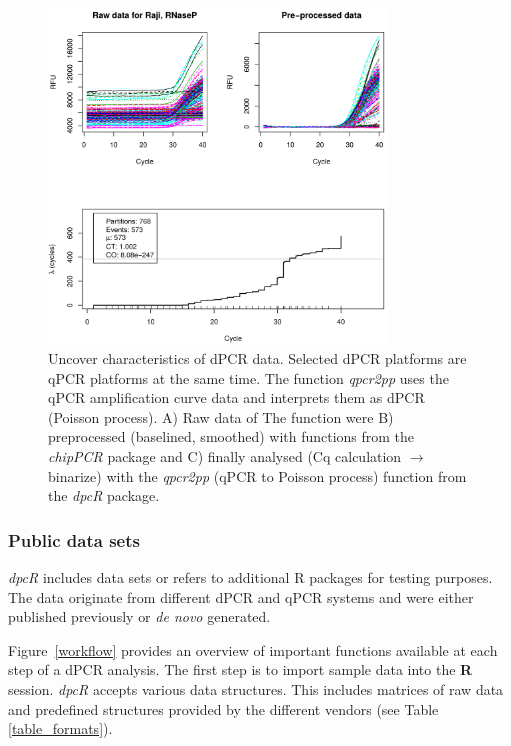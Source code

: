 \documentclass[a4,center,fleqn]{NAR}
\begin{document}
\begin{figure}[t]
\begin{center}
\includegraphics[width=9cm]{qpcr2pp_1.png}
\end{center}
\caption{Uncover characteristics of dPCR data. Selected dPCR platforms are qPCR 
platforms at the same time. The function \textit{qpcr2pp} uses the qPCR 
amplification curve data and interprets them as dPCR (Poisson process). A) Raw 
data of The function were B) preprocessed (baselined, smoothed) with functions 
from the \textit{chipPCR} package and C) finally analysed (Cq calculation 
$\rightarrow$ binarize) with the \textit{qpcr2pp} (qPCR to Poisson process) 
function from the \textit{dpcR} package.} 
\label{qpcr2pp_1}
\end{figure}


\subsubsection{Public data sets}

\textit{dpcR} includes data sets or refers to additional R packages for testing 
purposes. The data originate from different dPCR and qPCR systems and were 
either published previously \cite{whale_comparison_2012, roediger2015chippcr, 
white_digital_2009, rodiger_r_2015, dorazio_statistical_2015} or \textit{de 
novo} generated.

Figure~\ref{workflow} provides an overview of important functions available at 
each step of a dPCR analysis. The first step is to import sample data into the 
\textbf{R} session. \textit{dpcR} accepts various data structures. This includes 
matrices of raw data and predefined structures provided by the different vendors 
(see Table \ref{table_formats}). 
\end{document}
